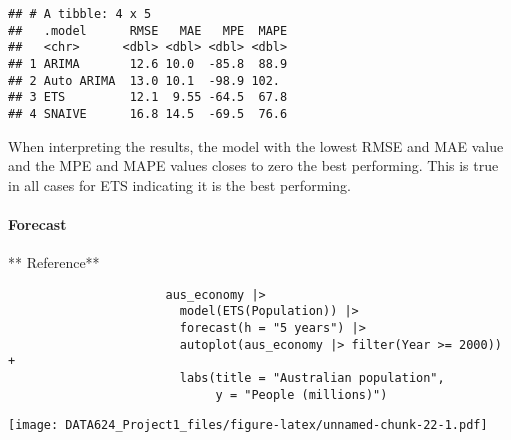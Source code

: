 \documentclass[
]{article}
\newenvironment{Shaded}{\begin{snugshade}}{\end{snugshade}}
\newcommand{\AttributeTok}[1]{\textcolor[rgb]{0.13,0.29,0.53}{#1}}
\newcommand{\CommentTok}[1]{\textcolor[rgb]{0.56,0.35,0.01}{\textit{#1}}}
\newcommand{\DecValTok}[1]{\textcolor[rgb]{0.00,0.00,0.81}{#1}}
\newcommand{\FunctionTok}[1]{\textcolor[rgb]{0.13,0.29,0.53}{\textbf{#1}}}
\newcommand{\NormalTok}[1]{#1}
\newcommand{\OtherTok}[1]{\textcolor[rgb]{0.56,0.35,0.01}{#1}}
\newcommand{\SpecialCharTok}[1]{\textcolor[rgb]{0.81,0.36,0.00}{\textbf{#1}}}
\newcommand{\StringTok}[1]{\textcolor[rgb]{0.31,0.60,0.02}{#1}}
\begin{document}
\begin{verbatim}
## # A tibble: 4 x 5
##   .model      RMSE   MAE   MPE  MAPE
##   <chr>      <dbl> <dbl> <dbl> <dbl>
## 1 ARIMA       12.6 10.0  -85.8  88.9
## 2 Auto ARIMA  13.0 10.1  -98.9 102. 
## 3 ETS         12.1  9.55 -64.5  67.8
## 4 SNAIVE      16.8 14.5  -69.5  76.6
\end{verbatim}

When interpreting the results, the model with the lowest RMSE and MAE
value and the MPE and MAPE values closes to zero the best performing.
This is true in all cases for ETS indicating it is the best performing.

\hypertarget{forecast}{%
\paragraph{Forecast}\label{forecast}}

** Reference**

\begin{verbatim}
                      aus_economy |>
                        model(ETS(Population)) |>
                        forecast(h = "5 years") |>
                        autoplot(aus_economy |> filter(Year >= 2000)) +
                        labs(title = "Australian population",
                             y = "People (millions)")
\end{verbatim}

\begin{Shaded}
\end{Shaded}

\texttt{[image: DATA624\_Project1\_files/figure-latex/unnamed-chunk-22-1.pdf]}
\end{document}
